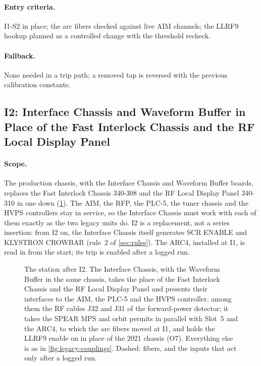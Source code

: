 \paragraph{Entry criteria.} I1-S2 in place; the arc fibers checked against live AIM
channels; the LLRF9 hookup planned as a controlled change with the threshold recheck.

\paragraph{Fallback.} None needed in a trip path; a removed tap is reversed with the
previous calibration constants.

\subsection{I2: Interface Chassis and Waveform Buffer in Place of the Fast Interlock
Chassis and the RF Local Display Panel}\label{sec:i-ic}

\paragraph{Scope.} The production chassis, with the Interface Chassis and Waveform
Buffer boards, replaces the Fast Interlock Chassis 340-308 and the RF Local Display
Panel 340-310 in one down (\cref{fig:after-ic}). The AIM, the RFP, the PLC-5, the
tuner chassis and the HVPS controllers stay in service, so the Interface Chassis must
work with each of them exactly as the two legacy units do. I2 is a replacement, not a
series insertion: from I2 on, the Interface Chassis itself generates SCR ENABLE
and KLYSTRON CROWBAR (rule~2 of \cref{sec:rules}). The ARC4, installed
at I1, is read in from the start; its trip is enabled after a logged run.

\begin{figure}[tbp]
\centering
\begin{fitpicture}

\end{fitpicture}
\caption[The station after I2.]{The station after I2. The Interface Chassis, with the
Waveform Buffer in the same chassis, takes the place of the Fast Interlock Chassis and
the RF Local Display Panel and presents their interfaces to the AIM, the PLC-5 and the
HVPS controller, among them the RF cables J32 and J31 of the forward-power detector; it
takes the SPEAR MPS and orbit permits in parallel with Slot~5 and the ARC4, to which
the arc fibers moved at I1, and holds the LLRF9 enable on in place of the 2021 chassis
(O7). Everything else is as in \cref{fig:legacy-couplings}. Dashed: fibers, and the
inputs that act only after a logged run.}\label{fig:after-ic}
\end{figure}

